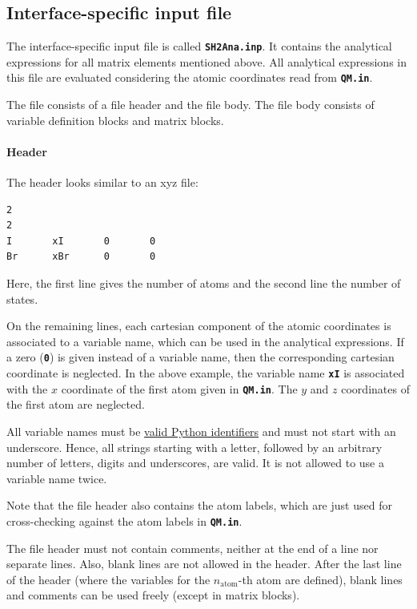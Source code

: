 \documentclass[a4paper,11pt,DIV=15,openany,twoside=false]{scrbook}
\newcommand{\ttt}[1]{\textbf{\texttt{#1}}}
\newenvironment{example}{
  \vspace{0mm}
  \definecolor{shadecolor}{HTML}{E4F4FF}
  \begin{shaded}
}{
  \end{shaded}
}
\begin{document}
\subsection{Interface-specific input file}

The interface-specific input file is called \ttt{SH2Ana.inp}. It contains the analytical expressions for all matrix elements mentioned above. All analytical expressions in this file are evaluated considering the atomic coordinates read from \ttt{QM.in}.

The file consists of a file header and the file body. The file body consists of variable definition blocks and matrix blocks.

\paragraph{Header} 

The header looks similar to an xyz file:
\begin{example}
  \begin{verbatim}
2
2
I       xI       0       0
Br      xBr      0       0
  \end{verbatim}
\end{example}
Here, the first line gives the number of atoms and the second line the number of states. 

On the remaining lines, each cartesian component of the atomic coordinates is associated to a variable name, which can be used in the analytical expressions. If a zero (\ttt{0}) is given instead of a variable name, then the corresponding cartesian coordinate is neglected. In the above example, the variable name \ttt{xI} is associated with the $x$ coordinate of the first atom given in \ttt{QM.in}. The $y$ and $z$ coordinates of the first atom are neglected.

All variable names must be \href{https://docs.python.org/2/reference/lexical_analysis.html#identifiers}{valid Python identifiers} and must not start with an underscore. Hence, all strings starting with a letter, followed by an arbitrary number of letters, digits and underscores, are valid. It is not allowed to use a variable name twice.

Note that the file header also contains the atom labels, which are just used for cross-checking against the atom labels in \ttt{QM.in}.

The file header must not contain comments, neither at the end of a line nor separate lines. Also, blank lines are not allowed in the header. After the last line of the header (where the variables for the $n_{\text{atom}}$-th atom are defined), blank lines and comments can be used freely (except in matrix blocks).
\end{document}
